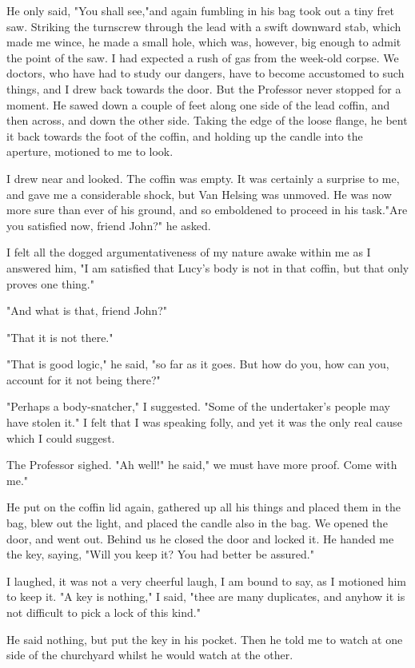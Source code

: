 He only said, "You shall see,"and again fumbling in his bag took out a tiny fret saw. Striking the turnscrew through the lead with a swift downward stab, which made me wince, he made a small hole, which was, however, big enough to admit the point of the saw. I had expected a rush of gas from the week-old corpse. We doctors, who have had to study our dangers, have to become accustomed to such things, and I drew back towards the door. But the Professor never stopped for a moment. He sawed down a couple of feet along one side of the lead coffin, and then across, and down the other side. Taking the edge of the loose flange, he bent it back towards the foot of the coffin, and holding up the candle into the aperture, motioned to me to look. 

I drew near and looked. The coffin was empty. It was certainly a surprise to me, and gave me a considerable shock, but Van Helsing was unmoved. He was now more sure than ever of his ground, and so emboldened to proceed in his task."Are you satisfied now, friend John?" he asked. 

I felt all the dogged argumentativeness of my nature awake within me as I answered him, "I am satisfied that Lucy's body is not in that coffin, but that only proves one thing." 

"And what is that, friend John?" 

"That it is not there." 

"That is good logic," he said, "so far as it goes. But how do you, how can you, account for it not being there?" 

"Perhaps a body-snatcher," I suggested. "Some of the undertaker's people may have stolen it." I felt that I was speaking folly, and yet it was the only real cause which I could suggest. 

The Professor sighed. "Ah well!" he said," we must have more proof. Come with me." 

He put on the coffin lid again, gathered up all his things and placed them in the bag, blew out the light, and placed the candle also in the bag. We opened the door, and went out. Behind us he closed the door and locked it. He handed me the key, saying, "Will you keep it? You had better be assured." 

I laughed, it was not a very cheerful laugh, I am bound to say, as I motioned him to keep it. "A key is nothing," I said, "thee are many duplicates, and anyhow it is not difficult to pick a lock of this kind." 

He said nothing, but put the key in his pocket. Then he told me to watch at one side of the churchyard whilst he would watch at the other. 

